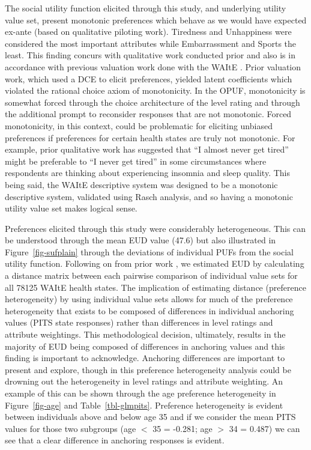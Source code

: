 \documentclass[
  number,
  preprint]{elsarticle}
\begin{document}
The social utility function elicited through this study, and underlying
utility value set, present monotonic preferences which behave as we
would have expected ex-ante (based on qualitative piloting work).
Tiredness and Unhappiness were considered the most important attributes
while Embarrassment and Sports the least. This finding concurs with
qualitative work conducted prior and also is in accordance with previous
valuation work done with the WAItE \citep{Robinson2024AUKValue}. Prior
valuation work, which used a DCE to elicit preferences, yielded latent
coefficients which violated the rational choice axiom of monotonicity.
In the OPUF, monotonicity is somewhat forced through the choice
architecture of the level rating and through the additional prompt to
reconsider responses that are not monotonic. Forced monotonicity, in
this context, could be problematic for eliciting unbiased preferences if
preferences for certain health states are truly not monotonic. For
example, prior qualitative work has suggested that ``I almost never get
tired'' might be preferable to ``I never get tired'' in some
circumstances where respondents are thinking about experiencing insomnia
and sleep quality. This being said, the WAItE descriptive system was
designed to be a monotonic descriptive system, validated using Rasch
analysis, and so having a monotonic utility value set makes logical
sense.

Preferences elicited through this study were considerably heterogeneous.
This can be understood through the mean EUD value (47.6) but also
illustrated in Figure~\ref{fig-sufplain} through the deviations of
individual PUFs from the social utility function. Following on from
prior work \citep{Schneider2024ExploringLevel}, we estimated EUD by
calculating a distance matrix between each pairwise comparison of
individual value sets for all 78125 WAItE health states. The implication
of estimating distance (preference heterogeneity) by using individual
value sets allows for much of the preference heterogeneity that exists
to be composed of differences in individual anchoring values (PITS state
responses) rather than differences in level ratings and attribute
weightings. This methodological decision, ultimately, results in the
majority of EUD being composed of differences in anchoring values and
this finding is important to acknowledge. Anchoring differences are
important to present and explore, though in this preference
heterogeneity analysis could be drowning out the heterogeneity in level
ratings and attribute weighting. An example of this can be shown through
the age preference heterogeneity in Figure~\ref{fig-age} and
Table~\ref{tbl-glmpits}. Preference heterogeneity is evident between
individuals above and below age 35 and if we consider the mean PITS
values for those two subgroups (age \(<\) 35 = -0.281; age \(>\) 34 =
0.487) we can see that a clear difference in anchoring responses is
evident.
\end{document}
